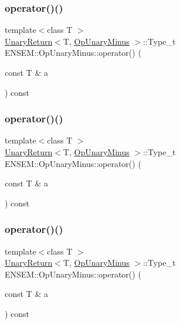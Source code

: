 \subsubsection{\texorpdfstring{operator()()}{operator()()}\hspace{0.1cm}{\footnotesize\ttfamily [1/3]}}
{\footnotesize\ttfamily template$<$class T $>$ \\
\mbox{\hyperlink{structENSEM_1_1UnaryReturn}{Unary\+Return}}$<$T, \mbox{\hyperlink{structENSEM_1_1OpUnaryMinus}{Op\+Unary\+Minus}} $>$\+::Type\+\_\+t E\+N\+S\+E\+M\+::\+Op\+Unary\+Minus\+::operator() (\begin{DoxyParamCaption}\item[{const T \&}]{a }\end{DoxyParamCaption}) const\hspace{0.3cm}{\ttfamily [inline]}}

\mbox{\label{structENSEM_1_1OpUnaryMinus_a34e70d7d677f60520ca94fa732d26926}} 
\subsubsection{\texorpdfstring{operator()()}{operator()()}\hspace{0.1cm}{\footnotesize\ttfamily [2/3]}}
{\footnotesize\ttfamily template$<$class T $>$ \\
\mbox{\hyperlink{structENSEM_1_1UnaryReturn}{Unary\+Return}}$<$T, \mbox{\hyperlink{structENSEM_1_1OpUnaryMinus}{Op\+Unary\+Minus}} $>$\+::Type\+\_\+t E\+N\+S\+E\+M\+::\+Op\+Unary\+Minus\+::operator() (\begin{DoxyParamCaption}\item[{const T \&}]{a }\end{DoxyParamCaption}) const\hspace{0.3cm}{\ttfamily [inline]}}

\mbox{\label{structENSEM_1_1OpUnaryMinus_a34e70d7d677f60520ca94fa732d26926}} 
\subsubsection{\texorpdfstring{operator()()}{operator()()}\hspace{0.1cm}{\footnotesize\ttfamily [3/3]}}
{\footnotesize\ttfamily template$<$class T $>$ \\
\mbox{\hyperlink{structENSEM_1_1UnaryReturn}{Unary\+Return}}$<$T, \mbox{\hyperlink{structENSEM_1_1OpUnaryMinus}{Op\+Unary\+Minus}} $>$\+::Type\+\_\+t E\+N\+S\+E\+M\+::\+Op\+Unary\+Minus\+::operator() (\begin{DoxyParamCaption}\item[{const T \&}]{a }\end{DoxyParamCaption}) const\hspace{0.3cm}{\ttfamily [inline]}}



